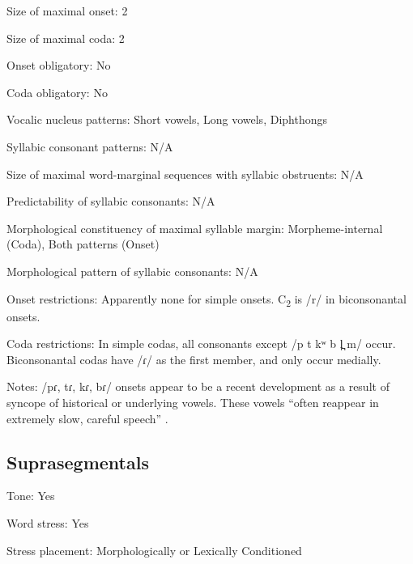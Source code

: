 {\begin{appendixdesc}
\item[Size of maximal onset:] 2

\item[Size of maximal coda:] 2

\item[Onset obligatory:] No

\item[Coda obligatory:] No

\item[Vocalic nucleus patterns:] Short vowels, Long vowels, Diphthongs

\item[Syllabic consonant patterns:] N/A

\item[Size of maximal word-marginal sequences with syllabic obstruents:] N/A

\item[Predictability of syllabic consonants:] N/A

\item[Morphological constituency of maximal syllable margin:] Morpheme-internal (Coda), Both patterns (Onset)

\item[Morphological pattern of syllabic consonants:] N/A

\item[Onset restrictions:] Apparently none for simple onsets. C\textsubscript{2} is /r/ in biconsonantal onsets.

\item[Coda restrictions:] In simple codas, all consonants except /p t kʷ b l̪ m/ occur. Biconsonantal codas have /ɾ/ as the first member, and only occur medially.

\item[Notes:] /pɾ, tɾ, kɾ, bɾ/ onsets appear to be a recent development as a result of syncope of historical or underlying vowels. These vowels “often reappear in extremely slow, careful speech” \citep[20]{Holt1999}.
\end{appendixdesc}
\subsection*{Suprasegmentals}
\begin{appendixdesc}
\item[Tone:] Yes

\item[Word stress:] Yes

\item[Stress placement:] Morphologically or Lexically Conditioned


\end{appendixdesc}}
